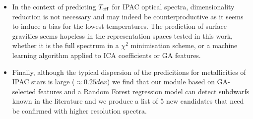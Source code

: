 \begin{itemize}
\item In the context of predicting $T_{\rm eff}$ for IPAC optical spectra, dimensionality reduction is not necessary and may indeed be counterproductive as it seems to induce a bias for the lowest temperatures. The prediction of surface gravities seems hopeless in the representation spaces tested in this work, whether it is the full spectrum in a $\chi^2$ minimisation scheme, or a machine learning algorithm applied to ICA coefficients or GA features.

\item Finally, although the typical dispersion of the predicitions for metallicities of IPAC stars is large ($\approx 0.25 dex$) we find that our module based on GA-selected features and a Random Forest regression model can detect subdwarfs known in the literature and we produce a list of 5 new candidates that need be confirmed with higher resolution spectra.  

\end{itemize}
